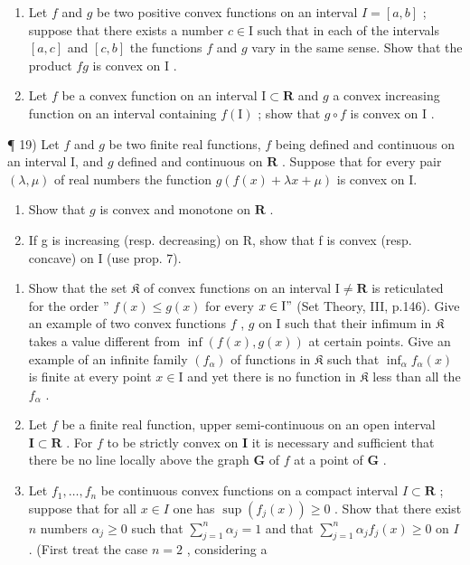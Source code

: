 \begin{enumerate}
\def\labelenumi{\arabic{enumi})}
\setcounter{enumi}{16}
\item
  Let \(f\) and \(g\) be two positive convex functions on an interval \(I = [a, b]\) ; suppose that there exists a number \(c \in \mathrm{I}\) such that in each of the intervals \([a, c]\) and \([c, b]\) the functions \(f\) and \(g\) vary in the same sense. Show that the product \(fg\) is convex on \(\mathrm{I}\) .
\item
  Let \(f\) be a convex function on an interval \(\mathrm{I} \subset \mathbf{R}\) and \(g\) a convex increasing function on an interval containing \(f(\mathrm{I})\) ; show that \(g \circ f\) is convex on \(\mathrm{I}\) .
\end{enumerate}

¶ 19) Let \(f\) and \(g\) be two finite real functions, \(f\) being defined and continuous on an interval I, and \(g\) defined and continuous on \(\mathbf{R}\) . Suppose that for every pair \((\lambda, \mu)\) of real numbers the function \(g(f(x) + \lambda x + \mu)\) is convex on I.

\begin{enumerate}
\def\labelenumi{\alph{enumi})}
\item
  Show that \(g\) is convex and monotone on \(\mathbf{R}\) .
\item
  If g is increasing (resp. decreasing) on R, show that f is convex (resp. concave) on I (use prop. 7).
\end{enumerate}

\begin{enumerate}
\def\labelenumi{\arabic{enumi})}
\setcounter{enumi}{19}
\item
  Show that the set \(\mathfrak{K}\) of convex functions on an interval \(\mathrm{I} \neq \mathbf{R}\) is reticulated for the order '' \(f(x) \leqslant g(x)\) for every \(x \in \mathrm{I}"\) (Set Theory, III, p.146). Give an example of two convex functions \(f\) , \(g\) on \(\mathrm{I}\) such that their infimum in \(\mathfrak{K}\) takes a value different from \(\inf(f(x), g(x))\) at certain points. Give an example of an infinite family \((f_{\alpha})\) of functions in \(\mathfrak{K}\) such that \(\inf_{\alpha} f_{\alpha}(x)\) is finite at every point \(x \in \mathrm{I}\) and yet there is no function in \(\mathfrak{K}\) less than all the \(f_{\alpha}\) .
\item
  Let \(f\) be a finite real function, upper semi-continuous on an open interval \(\mathbf{I} \subset \mathbf{R}\) . For \(f\) to be strictly convex on \(\mathbf{I}\) it is necessary and sufficient that there be no line locally above the graph \(\mathbf{G}\) of \(f\) at a point of \(\mathbf{G}\) .
\item
  Let \(f_{1}, \ldots, f_{n}\) be continuous convex functions on a compact interval \(I \subset \mathbf{R}\) ; suppose that for all \(x \in I\) one has \(\sup(f_{j}(x)) \geqslant 0\) . Show that there exist \(n\) numbers \(\alpha_{j} \geqslant 0\) such that \(\sum_{j=1}^{n} \alpha_{j} = 1\) and that \(\sum_{j=1}^{n} \alpha_{j} f_{j}(x) \geqslant 0\) on \(I\) . (First treat the case \(n = 2\) , considering a
\end{enumerate}

